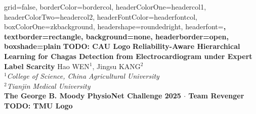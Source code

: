 \documentclass[a0paper,portrait]{baposter}
\begin{document}
\begin{poster}{
grid=false,
borderColor=bordercol, %
headerColorOne=headercol1, %
headerColorTwo=headercol2, %
headerFontColor=headerfontcol, %
boxColorOne=zkbackground,
headershape=roundedright, %
headerfont=\Large\sf\bf, %
textborder=rectangle,
background=none,
headerborder=open, %
boxshade=plain
}
%
%
{{\bf TODO: CAU Logo}} %
{
{\bf \fontsize{18pt}{18pt} \selectfont Reliability-Aware Hierarchical Learning for Chagas Detection from Electrocardiogram under Expert Label Scarcity}
} %
{\vspace{0.3em} \smaller Hao WEN$^1$, Jingsu KANG$^2$  \\  %

$^1${\it College of Science, China Agricultural University}\\
$^2${\it Tianjin Medical University} \\
\vspace{0.2cm}
{\Large \bf{The George B. Moody PhysioNet Challenge 2025} $\cdot$ \bf{Team Revenger}}
}
{{\bf TODO: TMU Logo}} %



\end{poster}
\end{document}
